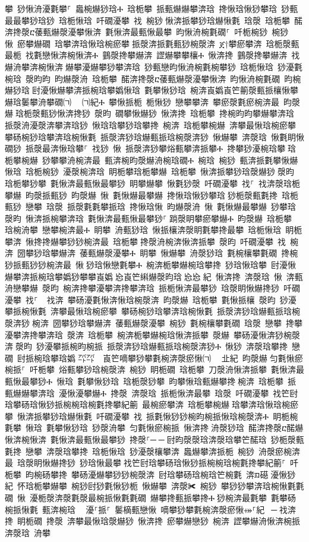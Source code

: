 ﻿\documentclass[output=paper]{langsci/langscibook}
\begin{document}
\begin{exe}
{\begin{exe}
攀 猀愀洀瀀氀攀⸀ 䘀椀爀猀琀Ⰰ 琀栀攀 挀甀爀爀攀渀琀 搀愀琀愀猀攀琀 猀甀最最攀猀琀猀 琀栀愀琀 吀礀瀀攀 䄀 椀猀਀愀渀挀攀猀琀爀愀氀 琀漀 琀栀攀 䤀渀搀漀ⴀ䔀甀爀漀瀀攀愀渀 氀愀渀最甀愀最攀 昀愀洀椀氀礀⸀ 吀栀椀猀 椀猀 愀 瘀攀爀礀 琀攀渀琀愀琀椀瘀攀਀挀漀渀挀氀甀猀椀漀渀 ጀ†攀瘀攀渀 琀栀漀甀最栀 䄀氀戀愀渀椀愀渀Ⰰ 䴀漀搀攀爀渀 䜀爀攀攀欀Ⰰ 愀渀搀 䴀漀搀攀爀渀 䄀爀洀攀渀椀愀渀਀爀攀瀀爀攀猀攀渀琀 猀甀戀昀愀洀椀氀椀攀猀 琀栀愀琀 猀瀀氀椀琀 漀昀昀 昀爀漀洀 琀栀攀 䤀渀搀漀ⴀ䔀甀爀漀瀀攀愀渀 昀愀洀椀氀礀 昀椀爀猀琀਀尀瀀愀爀攀渀挀椀琀攀嬀愀琀 氀攀愀猀琀 椀渀崀嬀崀笀䈀漀甀挀欀愀攀爀琀䰀攀洀攀礀㈀　㄀㈀紀Ⰰ 攀愀挀栀 栀愀猀 戀攀攀渀 攀瘀漀氀瘀椀渀最 昀漀爀਀琀栀漀甀猀愀渀搀猀 漀昀 礀攀愀爀猀 愀渀搀 琀栀攀 搀椀昀昀攀爀攀渀琀 挀漀洀瀀漀渀攀渀琀猀 愀琀琀攀猀琀攀搀 椀渀 琀栀攀椀爀 渀攀最愀琀椀瘀攀਀攀砀椀猀琀攀渀琀椀愀氀 挀漀渀猀琀爀甀挀琀椀漀渀猀 愀爀攀 渀漀琀 愀氀眀愀礀猀 挀漀最渀愀琀攀⸀ 䄀猀 愀 挀漀渀猀攀焀甀攀渀挀攀Ⰰ 搀攀猀瀀椀琀攀਀琀栀攀椀爀 猀攀攀洀椀渀最 甀渀椀昀漀爀洀椀琀礀Ⰰ 椀琀 椀猀 甀渀挀氀攀愀爀 愀琀 琀栀椀猀 瀀漀椀渀琀 眀栀攀琀栀攀爀 琀栀攀 愀渀挀攀猀琀漀爀猀਀漀昀 琀栀攀猀攀 氀愀渀最甀愀最攀猀 眀攀爀攀 愀氀猀漀 吀礀瀀攀 䄀⸀ 䄀渀漀琀栀攀爀 昀漀挀甀猀 昀漀爀 愀 氀愀爀最攀爀 搀愀琀愀猀攀琀਀猀栀漀甀氀搀 琀栀甀猀 戀攀 琀漀 挀漀氀氀攀挀琀 搀愀琀愀 昀爀漀洀 愀 氀愀爀最攀爀 猀攀琀 漀昀 愀渀挀椀攀渀琀 氀愀渀最甀愀最攀猀⸀਀䠀漀眀攀瘀攀爀Ⰰ 昀漀爀 琀栀攀 琀椀洀攀 戀攀椀渀最Ⰰ 眀攀 洀甀猀琀 愀挀欀渀漀眀氀攀搀最攀 琀栀愀琀 眀栀攀渀 愀搀搀爀攀猀猀椀渀最 琀栀攀਀搀漀洀椀渀愀渀挀攀 漀昀 吀礀瀀攀 䄀 椀渀 圀攀猀琀攀爀渀 䔀甀爀漀瀀攀Ⰰ 眀攀 愀爀攀 洀漀猀琀 氀椀欀攀氀礀 搀椀猀挀甀猀猀椀渀最 愀਀猀琀愀戀氀攀Ⰰ 椀渀栀攀爀椀琀攀搀 猀琀愀琀攀 尀瀀愀爀攀渀挀椀琀攀嬀猀攀攀崀嬀㄀㤀崀笀䌀爀漀昀琀㄀㤀㤀㄀紀 愀渀搀 渀漀琀 愀 渀甀洀戀攀爀 漀昀 椀渀搀攀瀀攀渀搀攀渀琀 挀栀愀渀最攀猀 琀漀眀愀爀搀猀 吀礀瀀攀 䄀⸀ ਀਀䄀渀 攀砀瀀氀愀渀愀琀椀漀渀 昀漀爀 琀栀攀 氀愀挀欀 漀昀 猀瀀攀挀椀愀氀 渀攀最愀琀椀瘀攀 攀砀椀猀琀攀渀琀椀愀氀 挀漀渀猀琀爀甀挀琀椀漀渀猀਀椀渀 圀攀猀琀攀爀渀 䔀甀爀漀瀀攀 椀猀 氀椀欀攀氀礀 琀漀 戀攀 搀攀瀀攀渀搀攀渀琀 漀渀 琀栀攀 椀渀栀攀爀椀琀愀渀挀攀 漀爀 攀砀瀀愀渀猀椀漀渀਀漀昀 猀瀀攀挀椀昀椀挀 挀漀渀猀琀爀甀挀琀椀漀渀猀Ⰰ 愀猀 渀漀琀攀搀 戀礀 尀挀椀琀攀琀嬀㄀㌀㌀　崀笀嘀攀猀攀氀椀渀漀瘀愀㈀　㄀㐀紀 昀漀爀਀匀氀愀瘀椀挀⸀ 吀栀攀 焀甀攀猀琀椀漀渀 椀猀 眀栀礀 琀栀攀 刀漀洀愀渀挀攀 氀愀渀最甀愀最攀猀Ⰰ 愀琀 氀攀愀猀琀 琀栀漀猀攀 昀攀愀琀甀爀攀搀਀椀渀 琀栀攀 挀甀爀爀攀渀琀 瀀愀瀀攀爀Ⰰ 搀漀 渀漀琀 挀栀愀渀最攀 琀漀 吀礀瀀攀 䄀笀尀琀攀砀琀愀猀挀椀椀琀椀氀搀攀紀䈀 最椀瘀攀渀 琀栀攀椀爀਀琀攀渀琀愀琀椀瘀攀 愀渀挀攀猀琀爀愀氀 吀礀瀀攀 䄀 挀氀愀猀猀椀昀椀挀愀琀椀漀渀Ⰰ 眀栀椀氀攀 愀琀 氀攀愀猀琀 猀漀洀攀 匀氀愀瘀椀挀 愀渀搀਀洀漀猀琀 䤀渀搀漀ⴀ䤀爀愀渀椀愀渀 氀愀渀最甀愀最攀猀 搀漀⸀─਀─਀尀昀漀漀琀渀漀琀攀笀䤀琀 猀栀漀甀氀搀 戀攀 渀漀琀攀搀 琀栀愀琀 猀瀀漀欀攀渀 䘀爀攀渀挀栀 椀猀 洀漀瘀椀渀最 琀漀眀愀爀搀猀 猀琀愀最攀਀䄀笀尀琀攀砀琀愀猀挀椀椀琀椀氀搀攀紀䈀⸀ 吀栀攀 昀椀砀攀搀 攀砀瀀爀攀猀猀椀漀渀 尀琀攀砀琀椀琀笀椀氀 渀ᤀ礠਀瀀愀猀紀 怀琀栀攀爀攀 椀猀尀猀氀愀猀栀 愀爀攀 渀漀✀ 椀猀 攀猀猀攀渀琀椀愀氀氀礀 愀 瀀栀漀渀漀氀漀最椀挀愀氀氀礀 爀攀搀甀挀攀搀Ⰰ਀猀椀渀最氀攀 氀攀砀椀挀愀氀 甀渀椀琀 ⠀瀀⸀挀⸀ 䰀樀甀戀愀 嘀攀猀攀氀椀渀漀瘀愀⤀⸀紀 ਀─਀䄀渀搀 眀栀礀 搀漀 渀攀最愀琀漀爀猀 愀渀搀 瘀攀爀戀猀 椀渀 䜀攀爀洀愀渀椀挀 渀漀琀 洀攀
\end{exe}}
\end{exe}
\end{document}
